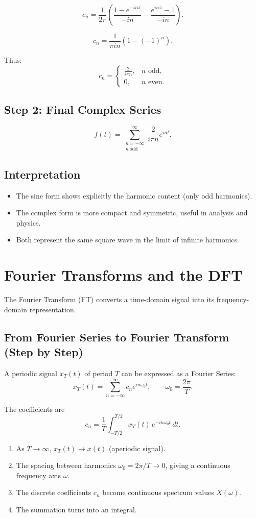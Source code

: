 \documentclass[a4paper,12pt]{article}
\begin{document}
\[
c_n = \frac{1}{2\pi}\left(\frac{1-e^{-in\pi}}{-in} - \frac{e^{in\pi}-1}{-in}\right).
\]

\[
c_n = \frac{1}{\pi in}(1-(-1)^n).
\]

Thus:
\[
c_n =
\begin{cases}
\frac{2}{i\pi n}, & n \text{ odd}, \\
0, & n \text{ even}.
\end{cases}
\]

\subsection{Step 2: Final Complex Series}
\[
f(t) = \sum_{\substack{n=-\infty \\ n\ \text{odd}}}^{\infty} \frac{2}{i\pi n} e^{int}.
\]

\subsection{Interpretation}
\begin{itemize}
    \item The sine form shows explicitly the harmonic content (only odd harmonics).
    \item The complex form is more compact and symmetric, useful in analysis and physics.
    \item Both represent the same square wave in the limit of infinite harmonics.
\end{itemize}

\section{\Huge\textbf{Fourier Transforms and the DFT}}
The Fourier Transform (FT) converts a time-domain signal into its frequency-domain representation.

\subsection{From Fourier Series to Fourier Transform (Step by Step)}

A periodic signal $x_T(t)$ of period $T$ can be expressed as a Fourier Series:
\[
x_T(t) = \sum_{n=-\infty}^{\infty} c_n e^{i n \omega_0 t}, 
\qquad \omega_0 = \frac{2\pi}{T}.
\]

The coefficients are
\[
c_n = \frac{1}{T} \int_{-T/2}^{T/2} x_T(t)\, e^{-i n \omega_0 t}\,dt.
\]

\begin{enumerate}
    \item As $T \to \infty$, $x_T(t) \to x(t)$ (aperiodic signal).
    \item The spacing between harmonics $\omega_0 = 2\pi/T \to 0$, giving a continuous frequency axis $\omega$.
    \item The discrete coefficients $c_n$ become continuous spectrum values $X(\omega)$.
    \item The summation turns into an integral.
\end{enumerate}
\end{document}

